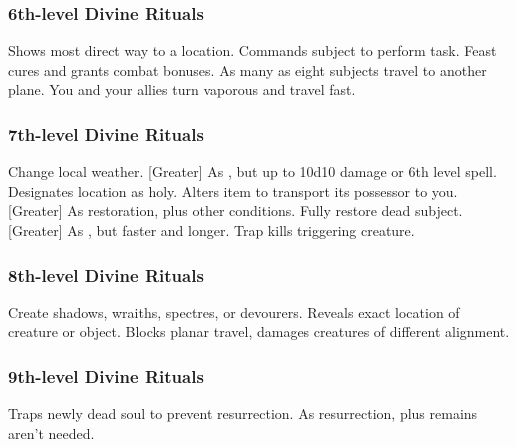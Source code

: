 \subsubsection{6th-level Divine Rituals}
\begin{rituallist}
     Shows most direct way to a location.
     Commands subject to perform task.
     Feast cures and grants combat bonuses.
    \F As many as eight subjects travel to another plane.
     You and your allies turn vaporous and travel fast.
\end{rituallist}

\subsubsection{7th-level Divine Rituals}
\begin{rituallist}
     Change local weather.
    [Greater] As , but up to 10d10 damage or 6th level spell.
     Designates location as holy.
     Alters item to transport its possessor to you.
    [Greater] As restoration, plus other conditions.
     Fully restore dead subject.
    [Greater] As , but faster and longer.
     Trap kills triggering creature.
\end{rituallist}

\subsubsection{8th-level Divine Rituals}
\begin{rituallist}
     Create shadows, wraiths, spectres, or devourers.
     Reveals exact location of creature or object.
     Blocks planar travel, damages creatures of different alignment.
\end{rituallist}

\subsubsection{9th-level Divine Rituals}
\begin{rituallist}
    \F Traps newly dead soul to prevent resurrection.
     As resurrection, plus remains aren't needed.
\end{rituallist}

